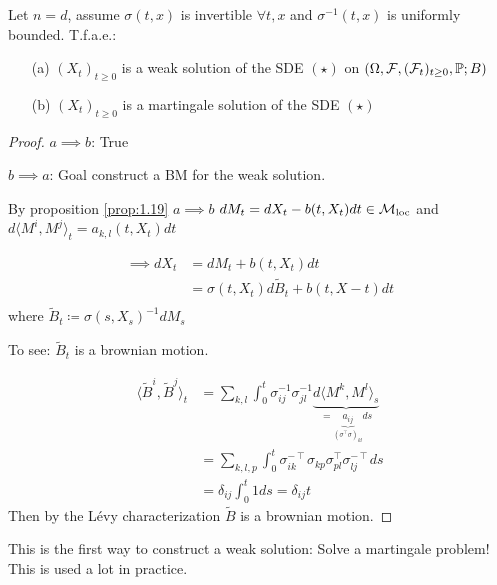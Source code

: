 \begin{theorem}\label{thm:1.20}
    Let $n=d$, %
    assume $\sigma(t,x)$ is invertible
    $\forall t,x$ and $\sigma^{-1}(t,x)$ is uniformly bounded. T.f.a.e.:
    \begin{enumerate}
        \item[(a)] $(X_t)_{t\geq 0}$ is a weak solution of the SDE $(\star)$ on $(\Omega,\mathcal{F},(\mathcal{F}_t)_{t\geq 0},\mathbb{P};B)$
        \item[(b)] $(X_t)_{t\geq 0}$ is a martingale solution of the SDE $(\star)$ 
    \end{enumerate}
\end{theorem}

\begin{proof}
    $a\implies b$: True 

    $b\implies a$: Goal construct a BM for the weak solution. 

    By proposition \ref{prop:1.19} $a\implies b$ $dM_t=dX_t-b(t,X_t)dt\in\mathcal{M}_{\text{loc}}$ and $d\langle M^i,M^j\rangle_t={a_{k,l}}(t,X_t)dt$

    \begin{align*}
        \implies dX_t&=dM_t+b(t,X_t)dt\\
        &=\sigma(t,X_t)d\tilde{B}_t+b(t,X-t)dt\\
    \end{align*}
    where $\tilde{B}_t\coloneqq \sigma(s,X_s)^{-1}dM_s$

    To see: $\tilde{B}_t$ is a brownian motion.

    \begin{align*}
        \langle \tilde{B}^i,\tilde{B}^j\rangle_t&=\sum_{k,l}\int_0^t\sigma_{ij}^{-1}\sigma_{jl}^{-1} \underbrace{d\langle M^k,M^l\rangle_s}_{=\underbrace{a_{ij}}_{(\sigma^\intercal \sigma)_{kl}}ds}\\
        &=\sum_{k,l,p}\int_0^t\sigma_{ik}^{-\intercal}\sigma_{kp}\sigma_{pl}^{\intercal}\sigma_{lj}^{-\intercal}ds\\
        &=\delta_{ij}\int_0^t 1 ds=\delta_{ij}t
    \end{align*}
    Then by the Lévy characterization $\tilde{B}$ is a brownian motion.
\end{proof}

\begin{aremark}
    This is the first way to construct a weak solution: Solve a martingale problem! This is used a lot in practice.
\end{aremark}

